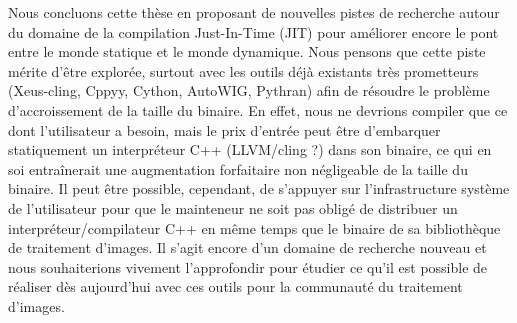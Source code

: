 Nous concluons cette thèse en proposant de nouvelles pistes de recherche autour du domaine de la compilation
Just-In-Time (JIT) pour améliorer encore le pont entre le monde statique et le monde dynamique. Nous pensons que cette
piste mérite d'être explorée, surtout avec les outils déjà existants très prometteurs (Xeus-cling, Cppyy, Cython,
AutoWIG, Pythran) afin de résoudre le problème d'accroissement de la taille du binaire. En effet, nous ne devrions
compiler que ce dont l'utilisateur a besoin, mais le prix d'entrée peut être d'embarquer statiquement un interpréteur
C++ (LLVM/cling ?) dans son binaire, ce qui en soi entraînerait une augmentation forfaitaire non négligeable de la
taille du binaire. Il peut être possible, cependant, de s'appuyer sur l'infrastructure système de l'utilisateur pour que
le mainteneur ne soit pas obligé de distribuer un interpréteur/compilateur C++ en même temps que le binaire de sa
bibliothèque de traitement d'images. Il s'agit encore d'un domaine de recherche nouveau et nous souhaiterions vivement
l'approfondir pour étudier ce qu'il est possible de réaliser dès aujourd'hui avec ces outils pour la communauté du
traitement d'images.

